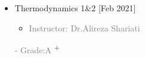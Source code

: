 \documentclass[10pt,a4paper,sans]{moderncv} %
\begin{document}
\begin{multicols}{2}
\begin{itemize}
\begin{itemize}
\begin{itemize}
                 \end{itemize}   
                 
			    \end{itemize}
			    
			\item {} Thermodynamics 1\&2 \hfill[Feb 2021]
               \begin{itemize}
                \item\textcolor{gray}{Instructor: 
                {Dr.Alireza Shariati}}
                \end{itemize}
                
                \begin{itemize}
                \textcolor{gray}{- Grade:A }\textsuperscript{+}
                \end{itemize}
                
            
                 
			    
		     			


			
			\vspace{0.1 em} 
			
				
				
				
				
			
			\vspace{0.3 em} 
			

			\end{itemize}

		
	\end{multicols}
	
	\vspace{-0.00 em}
	
\end{document}
